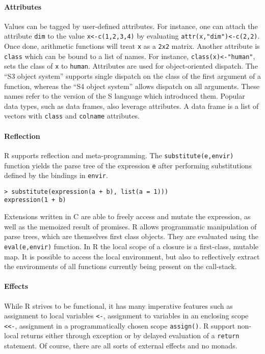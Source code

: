 \documentclass[review,nonacm,screen,acmsmall,anonymous=true]{acmart}
\newcommand{\code}[1]{\lstinline |#1|\xspace}
\begin{document}
\paragraph{Attributes}
Values can be tagged by user-defined attributes. For instance, one can attach
the attribute \code{dim} to the value \code{x<-c(1,2,3,4)} by evaluating
\code{attr(x,"dim")<-c(2,2)}. Once done, arithmetic functions will treat \code x
as a \code{2x2} matrix. Another attribute is \code{class} which can be bound to
a list of names. For instance, \code{class(x)<-"human"}, sets the class of
\code{x} to \code{human}. Attributes are used for object-oriented dispatch. The
``S3 object system'' supports single dispatch on the class of the first argument
of a function, whereas the ``S4 object system'' allows dispatch on all
arguments. These names refer to the version of the S language which introduced
them. Popular data types, such as data frames, also leverage attributes. A data
frame is a list of vectors with \code{class} and \code{colname} attributes.

\paragraph{Reflection}
R supports reflection and meta-programming. The \code{substitute(e,envir)}
function yields the parse tree of the expression \code{e} after performing
substitutions defined by the bindings in \code{envir}.
\vspace{-1mm}
\begin{lstlisting}
> substitute(expression(a + b), list(a = 1)))
expression(1 + b)
\end{lstlisting}
\noindent
Extensions written in C are able to freely access and mutate the expression, as
well as the memoized result of promises. R allows
programmatic manipulation of parse trees, which are themselves first class
objects. They are evaluated using the \code{eval(e,envir)} function.
In R the local scope of a closure is a first-class, mutable map.
It is possible to access the local environment, but also to reflectively extract the environments of all
functions currently being present on the call-stack.

\paragraph{Effects} While R strives to be functional, it has many imperative
features such as assignment to local variables \code{<-}, assignment to
variables in an enclosing scope \code{<<-}, assignment in a programmatically
chosen scope \code{assign()}. R support non-local returns either through
exception or by delayed evaluation of a \code{return} statement. Of course,
there are all sorts of external effects and no monads.
\end{document}
